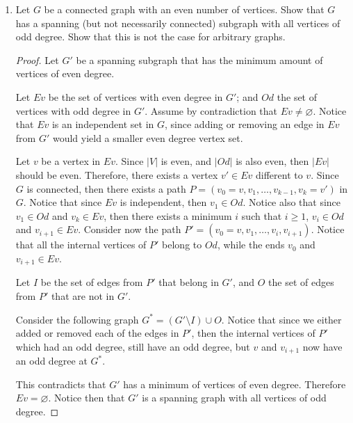 \documentclass[12pt]{article}
\begin{document}
\begin{enumerate}
\begin{proof}
        Since $v_1$ is adjacent to $v$ and it is also adjacent to $v_2$ and to any neighbor of $v$, it follows that $\delta(v_1) \geq \delta(v)+1$. Therefore $\delta(v_1)> \delta(v)$. This contradicts that $v$ is a vertex of maximum degree.
    \end{proof}
    
    \item Let $G$ be a connected graph with an even number of vertices. Show that $G$ has a spanning (but not necessarily connected) subgraph with all vertices of odd degree. Show that this is not the case for arbitrary graphs.
    
    \begin{proof}
        Let $G'$ be a spanning subgraph that has the minimum amount of vertices of even degree.
        
        Let $Ev$ be the set of vertices with even degree in $G'$; and $Od$ the set of vertices with odd degree in $G'$.  Assume by contradiction that $Ev \neq \varnothing$. Notice that $Ev$ is an independent set in $G$, since adding or removing an edge in $Ev$ from $G'$ would yield a smaller even degree vertex set.
        
        Let $v$ be a vertex in $Ev$. Since $\vert V \vert $ is even, and $\vert Od \vert$ is also even, then $\vert Ev \vert$ should be even. Therefore, there exists a vertex $v' \in Ev$ different to $v$. Since $G$ is connected, then there exists a path $P = (v_0 =v, v_1, \ldots,v_{k-1}, v_k = v')$ in $G$. Notice that since $Ev$ is independent, then $v_1 \in Od$. Notice also that since $v_1 \in Od$ and $v_k \in Ev$, then there exists a minimum $i$ such that $i \geq 1$, $v_i \in Od$ and $v_{i+1} \in Ev$. Consider now the path $P' = (v_0 = v, v_1, \ldots, v_i, v_{i+1})$. Notice that all the internal vertices of $P'$ belong to $Od$, while the ends $v_0$ and $v_{i+1} \in Ev$.
        
        Let $I$ be the set of edges from $P'$ that belong in $G'$, and $O$ the set of edges from $P'$ that are not in $G'$. 
        
        Consider the following graph $G^* = (G'\setminus I) \cup O$. Notice that since we either added or removed each of the edges in $P'$, then the internal vertices of $P'$ which had an odd degree, still have an odd degree, but $v$ and $v_{i+1}$ now have an odd degree at $G^*$.
        
        This contradicts that $G'$ has a minimum of vertices of even degree.
        Therefore $Ev = \varnothing$. Notice then that $G'$ is a spanning graph with all vertices of odd degree.
    \end{proof}
    

\end{enumerate}
\end{document}
